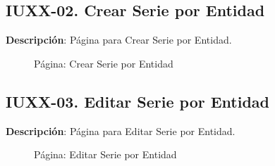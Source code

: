 \clearpage
\subsection{IUXX-02. Crear Serie por Entidad} \label{sec:ui-page-create-serieentidad}

\textbf{Descripción}: Página para Crear Serie por Entidad.\\

\begin{figure}[H]
	\label{tab:ui-create-serieentidad-page}
	\caption{Página: Crear Serie por Entidad}
\end{figure}

\begin{table}[H]
	\caption{Forma: Crear Serie por Entidad}
	\label{tab:ui-create-serieentidad-form}
\end{table}

\clearpage
\subsection{IUXX-03. Editar Serie por Entidad} \label{sec:ui-page-update-serieentidad}

\textbf{Descripción}: Página para Editar Serie por Entidad.\\

\begin{figure}[H]
	\label{tab:ui-edit-serieentidad-page}
	\caption{Página: Editar Serie por Entidad}
\end{figure}

